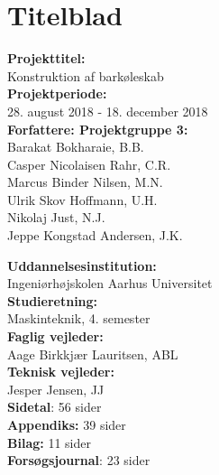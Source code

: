 \documentclass[../Hovedrapport.tex]{subfiles}
\begin{document}
\setcounter{page}{0}
\chapter*{Titelblad}
\begin{minipage}[t]{0.5\textwidth}
\textbf{Projekttitel:}                          \\
Konstruktion af barkøleskab      \\[0.5cm]

\textbf{Projektperiode:}                        \\
28. august 2018 - 18. december 2018                       \\[0.5cm]

\textbf{Forfattere: Projektgruppe 3:}    \\
Barakat Bokharaie,       B.B.                   \\
Casper Nicolaisen Rahr,  C.R.              \\
Marcus Binder Nilsen,    M.N.                \\
Ulrik Skov Hoffmann,     U.H.                 \\
Nikolaj Just,            N.J.                        \\
Jeppe Kongstad Andersen, J.K.             \\
\end{minipage}
\begin{minipage}[t]{0.5\textwidth}
\textbf{Uddannelsesinstitution:}        \\
Ingeniørhøjskolen Aarhus Universitet    \\[0.5cm]

\textbf{Studieretning:}                 \\
Maskinteknik, 4. semester               \\[0.5cm]

\textbf{Faglig vejleder:}               \\
Aage Birkkjær Lauritsen, ABL            \\

\textbf{Teknisk vejleder:}              \\
Jesper Jensen, JJ                       \\[0.5 cm]

\textbf{Sidetal}:   56 sider            \\
\textbf{Appendiks:} 39 sider            \\
\textbf{Bilag:}     11 sider            \\
\textbf{Forsøgsjournal}: 23 sider       \\
\end{minipage}
	
\end{document}
